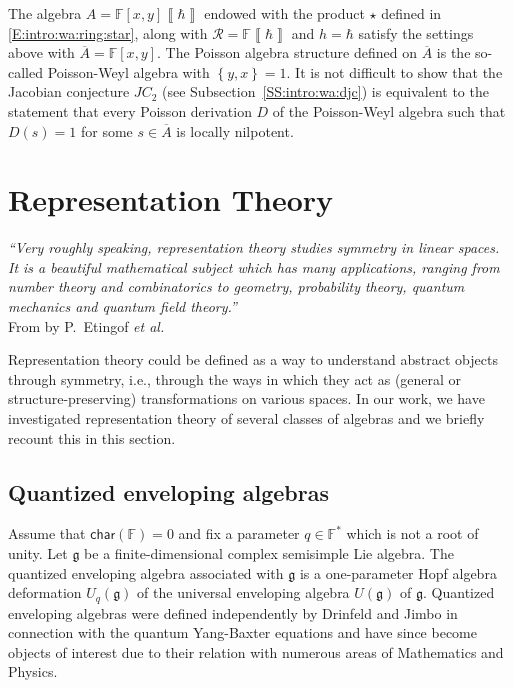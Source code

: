 \documentclass{commat}
\newcommand{\FF}{\mathbb{F}}
\newcommand\chara{\mathsf {char}}
\newcommand{\barr}[1]{\overline{#1}}
\newcommand{\g}{\mathfrak g}
\newcommand{\pb}[1]{\left\{ #1\right\}}
\newcommand{\formal}[1]{\left\llbracket #1\right\rrbracket}
\begin{document}
The algebra $A=\FF[x,y]\!\!\formal{\hbar}$ endowed with the product $\star$ defined in \eqref{E:intro:wa:ring:star}, along with $\mathcal R=\FF\formal{\hbar}$ and $h=\hbar$ satisfy the settings above with $\barr A=\FF[x,y]$. The Poisson algebra structure defined on $\barr A$ is the so-called Poisson-Weyl algebra with $\pb{y,x}=1$. It is not difficult to show that the Jacobian conjecture $JC_2$ (see Subsection~\ref{SS:intro:wa:djc}) is equivalent to the statement that every Poisson derivation $D$ of the Poisson-Weyl algebra such that $D(s)=1$ for some $s\in\barr A$ is locally nilpotent.


\section{Representation Theory}\label{S:rep}

\begin{flushright}{\it
		``Very roughly speaking, representation theory studies symmetry in linear spaces. It is a beautiful mathematical subject which has many applications, ranging from number theory and combinatorics to geometry, probability theory, quantum mechanics and quantum field theory.''} \\
	From \cite[Introduction]{pE11} by P.\ Etingof \textit{et al.}
\end{flushright}


\bigskip

Representation theory could be defined as a way to understand abstract objects through symmetry, i.e., through the ways in which they act as (general or structure-preserving) transformations on various spaces. In our work, we have investigated representation theory of several classes of algebras and we briefly recount this in this section. 

\subsection{Quantized enveloping algebras}\label{SS:rep:uq+}

Assume that $\chara(\FF)=0$ and fix a parameter $q\in\FF^*$ which is not a root of unity. Let $\g$ be a finite-dimensional complex semisimple Lie algebra. The quantized enveloping algebra associated with $\g$ is a one-parameter Hopf algebra deformation $U_q(\g)$ of the universal enveloping algebra $U(\g)$ of $\g$. Quantized enveloping algebras were defined independently by Drinfeld \cite{vD85} and Jimbo \cite{mJ85} in connection with the quantum Yang-Baxter equations and have since become objects of interest due to their relation with numerous areas of Mathematics and Physics.
\end{document}
